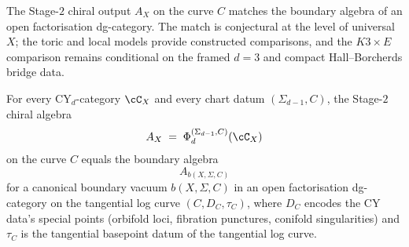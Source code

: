 The Stage-$2$ chiral output $A_{X}$ on the curve $C$ matches the
boundary algebra of an open factorisation dg-category. The match is
conjectural at the level of universal $X$; the toric and local models
provide constructed comparisons, and the \(K3\times E\) comparison remains
conditional on the framed \(d=3\) and compact Hall--Borcherds bridge data.

\begin{conjecture}
\label{conj:bulk-chain-fusion}
\ClaimStatusConjectured
For every CY$_{d}$-category $\cC_{X}$ and every chart datum
$(\Sigma_{d-1}, C)$, the Stage-$2$ chiral algebra
\[
 A_{X} \;=\; \Phi^{(\Sigma_{d-1}, C)}_{d}(\cC_{X})
\]
on the curve $C$ equals the boundary algebra
\[
 A_{b(X, \Sigma, C)}
\]
for a canonical boundary vacuum $b(X, \Sigma, C)$ in an open
factorisation dg-category on the tangential log curve
$(C, D_{C}, \tau_{C})$, where $D_{C}$ encodes the CY data's
special points (orbifold loci, fibration punctures, conifold
singularities) and $\tau_{C}$ is the tangential basepoint datum
of the tangential log curve.
\end{conjecture}

